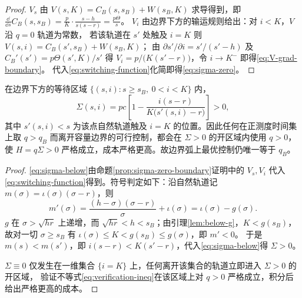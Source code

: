 \begin{proof}
$V_s$ 由 $V(s,K)=C_B(s,s_B)+W(s_B,K)$ 求导得到，即
$\frac{\dd}{\dd s}C_B(s,s_B)=\frac{p}{K}\cdot\frac{s-h}{s(s-r)}=\frac{p\Theta}{s}$。
$V_i$ 由边界下方的输运规则给出：对 $i<K$，$V$ 沿 $q=0$ 轨道为常数，
若该轨道在 $s'$ 处触及 $i=K$ 则 $V(s,i)=C_B(s',s_B)+W(s_B,K)$；
由 $\partial s'/\partial i=s'/(s'-h)$ 及 $C_B'(s')=p\Theta(s',K)/s'$ 得
$V_i=p/\bigl(K(s'-r)\bigr)$，令 $i\to K^-$ 即得\eqref{eq:V-grad-boundary}。
代入\eqref{eq:switching-function}化简即得\eqref{eq:sigma-zero}。
\end{proof}

\begin{proposition}[边界弧控制仍唯一]
\label{prop:boundary-unique}
在边界下方的等待区域 $\{(s,i):s\ge s_B,\ 0<i<K\}$ 内，
\begin{equation}
\Sigma(s,i)=pc\left[1-\frac{i(s-r)}{K\bigl(s'(s,i)-r\bigr)}\right]>0,
\label{eq:sigma-below}
\end{equation}
其中 $s'(s,i)<s$ 为该点自然轨道触及 $i=K$ 的位置。因此任何在正测度时间集上取 $q>q_B$
而离开容量边界的可行控制，都会在 $\Sigma>0$ 的开区域内使用 $q>0$，
使 $H=q\Sigma>0$ 严格成立，成本严格更高。故边界弧上最优控制仍唯一等于 $q_B$。
\end{proposition}

\begin{proof}
\eqref{eq:sigma-below}由命题\ref{prop:sigma-zero-boundary}证明中的 $V_s,V_i$ 代入
\eqref{eq:switching-function}得到。符号判定如下：沿自然轨道记 $m(\sigma)=\iota(\sigma)(\sigma-r)$，则
\[
m'(\sigma)=\frac{(h-\sigma)(\sigma-r)}{\sigma}+\iota(\sigma)=\iota(\sigma)-g(\sigma).
\]
$g$ 在 $\sigma>\sqrt{hr}$ 上递增，而 $\sqrt{hr}<h<s_B$；由引理\ref{lem:below-g}，$K<g(s_B)$，
故对一切 $\sigma\ge s_B$ 有 $\iota(\sigma)\le K<g(s_B)\le g(\sigma)$，即 $m'<0$。
于是 $m(s)<m(s')$，即 $i(s-r)<K(s'-r)$，代入\eqref{eq:sigma-below}得 $\Sigma>0$。

$\Sigma\equiv0$ 仅发生在一维集合 $\{i=K\}$ 上，任何离开该集合的轨道立即进入 $\Sigma>0$ 的开区域，
验证不等式\eqref{eq:verification-ineq}在该区域上对 $q>0$ 严格成立，积分后给出严格更高的成本。
\end{proof}

